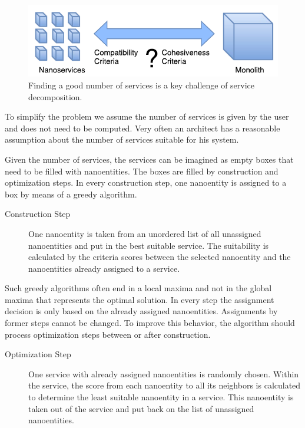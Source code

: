 \begin{figure}[H]
	\begin{center}
		\includegraphics[scale=1]{diagrams/HeuristicApproach.pdf}
	\end{center}
	\caption{Finding a good number of services is a key challenge of service decomposition.}
	\label{fig:numberOfServices}
\end{figure}

To simplify the problem we assume the number of services is given by the user and does not need to be computed. Very often an architect has a reasonable assumption about the number of services suitable for his system. 

Given the number of services, the services can be imagined as empty boxes that need to be filled with nanoentities. The boxes are filled by construction and optimization steps. In every construction step, one nanoentity is assigned to a box by means of a greedy algorithm.

\begin{description}
	\item[Construction Step] One nanoentity is taken from an unordered list of all unassigned nanoentities and put in the best suitable service. The suitability is calculated by the criteria scores between the selected nanoentity and the nanoentities already assigned to a service. 
\end{description}

Such greedy algorithms often end in a local maxima and not in the global maxima that represents the optimal solution. In every step the assignment decision is only based on the already assigned nanoentities. Assignments by former steps cannot be changed. 
To improve this behavior, the algorithm should process optimization steps between or after construction. 

\begin{description}
\item[Optimization Step] One service with already assigned nanoentities is randomly chosen. Within the service, the score from each nanoentity to all its neighbors is calculated to determine the least suitable nanoentity in a service. This nanoentity is taken out of the service and put back on the list of unassigned nanoentities.
\end{description}


